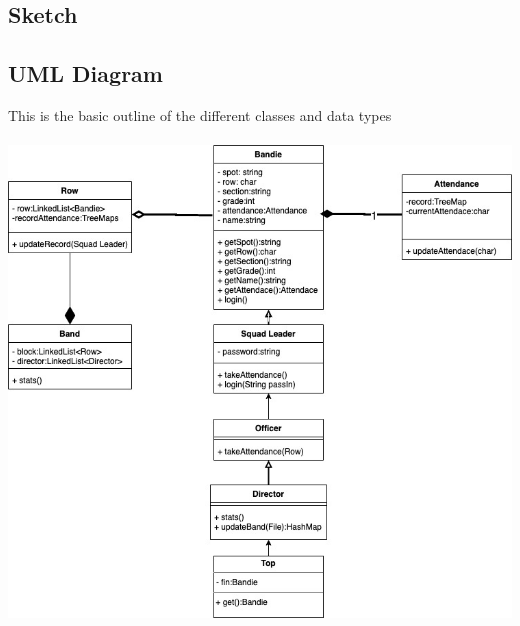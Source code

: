 \documentclass{article}
\begin{document}
\subsection{Sketch}
\subsection{UML Diagram}
This is the basic outline of the different classes and data types \\ \\
\includegraphics[width=6in]{IA UML and Flowchart-UML.jpg}
\end{document}
